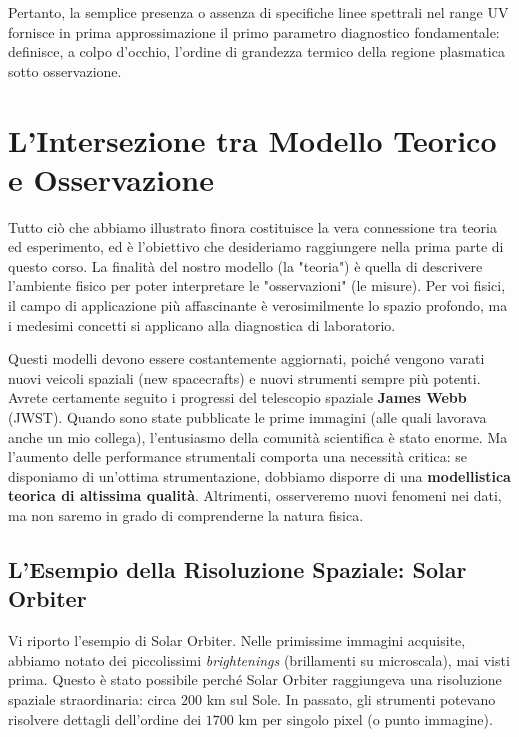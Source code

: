     Pertanto, la semplice presenza o assenza di specifiche linee spettrali nel range UV fornisce in prima approssimazione il primo parametro diagnostico fondamentale: definisce, a colpo d'occhio, l'ordine di grandezza termico della regione plasmatica sotto osservazione.
    
\section{L'Intersezione tra Modello Teorico e Osservazione}

Tutto ciò che abbiamo illustrato finora costituisce la vera connessione tra teoria ed esperimento, ed è l'obiettivo che desideriamo raggiungere nella prima parte di questo corso. La finalità del nostro modello (la "teoria") è quella di descrivere l'ambiente fisico per poter interpretare le "osservazioni" (le misure).
Per voi fisici, il campo di applicazione più affascinante è verosimilmente lo spazio profondo, ma i medesimi concetti si applicano alla diagnostica di laboratorio.

Questi modelli devono essere costantemente aggiornati, poiché vengono varati nuovi veicoli spaziali (new spacecrafts) e nuovi strumenti sempre più potenti. Avrete certamente seguito i progressi del telescopio spaziale \textbf{James Webb} (JWST). Quando sono state pubblicate le prime immagini (alle quali lavorava anche un mio collega), l'entusiasmo della comunità scientifica è stato enorme. Ma l'aumento delle performance strumentali comporta una necessità critica: se disponiamo di un'ottima strumentazione, dobbiamo disporre di una \textbf{modellistica teorica di altissima qualità}. Altrimenti, osserveremo nuovi fenomeni nei dati, ma non saremo in grado di comprenderne la natura fisica.

    \subsection{L'Esempio della Risoluzione Spaziale: Solar Orbiter}
    
    Vi riporto l'esempio di Solar Orbiter. Nelle primissime immagini acquisite, abbiamo notato dei piccolissimi \textit{brightenings} (brillamenti su microscala), mai visti prima. Questo è stato possibile perché Solar Orbiter raggiungeva una risoluzione spaziale straordinaria: circa $200\text{ km}$ sul Sole.
    In passato, gli strumenti potevano risolvere dettagli dell'ordine dei $1700\text{ km}$ per singolo pixel (o punto immagine).
    
